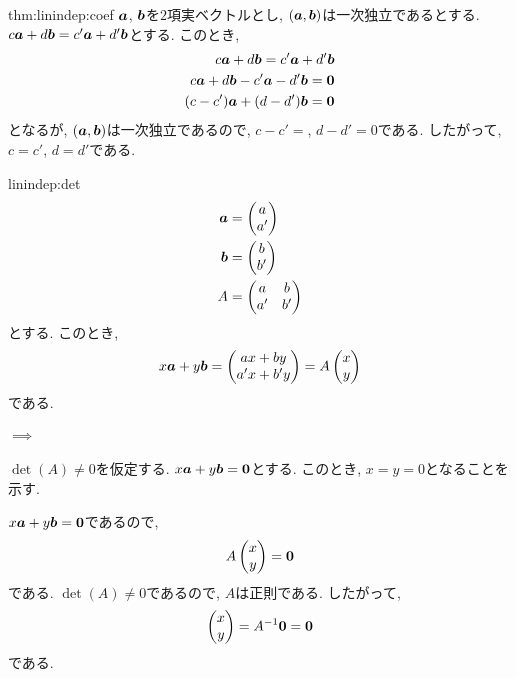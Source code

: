 \begin{proofof}{thm:linindep:coef}
  $\boldsymbol{a}$, $\boldsymbol{b}$を$2$項実ベクトルとし,
  $(\boldsymbol{a},\boldsymbol{b})$は一次独立であるとする.
  $c\boldsymbol{a} + d\boldsymbol{b} = c'\boldsymbol{a}+d'\boldsymbol{b}$とする.
  このとき,
  \begin{align*}
    c\boldsymbol{a} + d\boldsymbol{b} = c'\boldsymbol{a}+d'\boldsymbol{b}\\
    c\boldsymbol{a} + d\boldsymbol{b} -c'\boldsymbol{a}-d'\boldsymbol{b}=\boldsymbol{0} \\
    (c-c')\boldsymbol{a} + (d -d')\boldsymbol{b}=\boldsymbol{0} 
  \end{align*}
  となるが, 
  $(\boldsymbol{a},\boldsymbol{b})$は一次独立であるので,
  $c-c'=$, $d-d'=0$である.
  したがって, $c=c'$, $d=d'$である.
\end{proofof}
\begin{proofof}{linindep:det}
  \begin{align*}
    \boldsymbol{a}&=\begin{pmatrix}a\\a'\end{pmatrix}\\
    \boldsymbol{b}&=\begin{pmatrix}b\\b'\end{pmatrix}\\
    A&=\begin{pmatrix}a&b\\a'&b'\end{pmatrix}
  \end{align*}
  とする. このとき,
  \begin{align*}
    x\boldsymbol{a}+y\boldsymbol{b}=\begin{pmatrix}ax+by\\a'x+b'y\end{pmatrix}=A\begin{pmatrix}x\\y\end{pmatrix}
  \end{align*}
  である.

  \paragraph{$\implies$}
  $\det(A)\neq 0$を仮定する.
  $x\boldsymbol{a}+y\boldsymbol{b}=\boldsymbol{0}$とする.
  このとき, $x=y=0$となることを示す.

  $x\boldsymbol{a}+y\boldsymbol{b}=\boldsymbol{0}$であるので,
  \begin{align*}
    A\begin{pmatrix}x\\y\end{pmatrix}=\boldsymbol{0}
  \end{align*}
  である.
  $\det(A)\neq 0$であるので, $A$は正則である.
  したがって,
  \begin{align*}
    \begin{pmatrix}x\\y\end{pmatrix}=A^{-1}\boldsymbol{0}=\boldsymbol{0}
  \end{align*}
  である.
  

\end{proofof}
